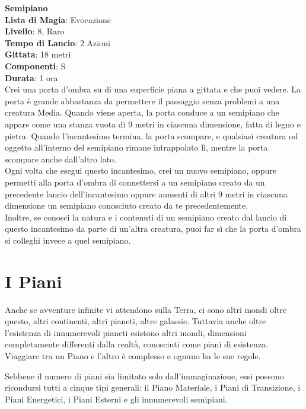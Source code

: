 \documentclass[a4paper,twoside,openany]{book}
\begin{document}
\begin{multicols}{2}
\medskip\textbf{Semipiano}\\
\textbf{Lista di Magia}: Evocazione\\
\textbf{Livello}: 8, Raro\\
\textbf{Tempo di Lancio}: 2 Azioni\\
\textbf{Gittata}: 18 metri\\
\textbf{Componenti}: S\\
\textbf{Durata}: 1 ora\\
Crei una porta d'ombra su di una superficie piana a gittata e che puoi vedere. La porta è grande abbastanza da permettere il passaggio senza problemi a una creatura Media. Quando viene aperta, la porta conduce a un semipiano che appare come una stanza vuota di 9 metri in ciascuna dimensione, fatta di legno e pietra. Quando l'incantesimo termina, la porta scompare, e qualsiasi creatura od oggetto all'interno del semipiano rimane intrappolato lì, mentre la porta scompare anche dall'altro lato.\\
Ogni volta che esegui questo incantesimo, crei un nuovo semipiano, oppure permetti alla porta d'ombra di connettersi a un semipiano creato da un precedente lancio dell'incantesimo oppure aumenti di altri 9 metri in ciascuna dimensione un semipiano conosciuto creato da te precedentemente. \\
Inoltre, se conosci la natura e i contenuti di un semipiano creato dal lancio di questo incantesimo da parte di un'altra creatura, puoi far sì che la porta d'ombra si colleghi invece a quel semipiano.

\end{multicols}

\pagebreak

\section{I Piani}\label{ipiani}

Anche se avventure infinite vi attendono sulla Terra, ci sono altri mondi oltre questo, altri continenti, altri pianeti, altre galassie. Tuttavia anche oltre l'esistenza di innumerevoli pianeti esistono altri mondi, dimensioni completamente differenti dalla realtà, conosciuti come piani di esistenza. Viaggiare tra un Piano e l'altro è complesso e ognuno ha le sue regole.

Sebbene il numero di piani sia limitato solo dall'immaginazione, essi possono ricondursi tutti a cinque tipi generali: il Piano Materiale, i Piani di Transizione, i Piani Energetici, i Piani Esterni e gli innumerevoli semipiani.
\end{document}
